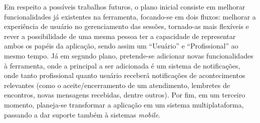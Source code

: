 Em respeito a possíveis trabalhos futuros, o plano inicial consiste em melhorar funcionalidades já existentes na ferramenta, focando-se em dois fluxos: melhorar a experiência de usuário no gerenciamento das sessões, tornado-as mais flexíveis e rever a possibilidade de uma mesma pessoa ter a capacidade de representar ambos os papéis da aplicação, sendo assim um “Usuário” e “Profissional” ao mesmo tempo. Já em segundo plano, pretende-se adicionar novas funcionalidades à ferramenta, onde a principal a ser adicionada é um sistema de notificações, onde tanto profissional quanto usuário receberá notificações de acontecimentos relevantes (como o aceite/encerramento de um atendimento, lembretes de encontros, novas mensagens recebidas, dentre outros). Por fim, em um terceiro momento, planeja-se transformar a aplicação em um sistema multiplataforma, passando a dar suporte também à sistemas \textit{mobile}.
